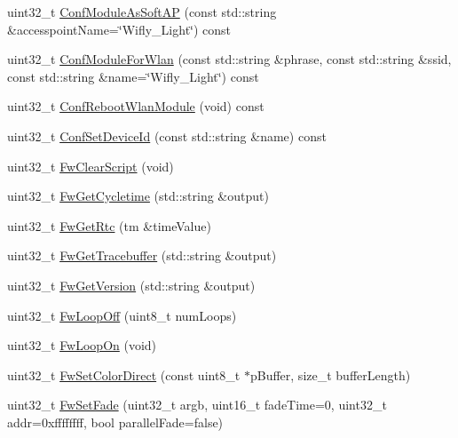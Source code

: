 \begin{DoxyCompactItemize}
\item 
uint32\-\_\-t \hyperlink{class_wifly_control_no_throw_a3e64aeb861c86a81d9818321b2876ffd}{Conf\-Module\-As\-Soft\-A\-P} (const std\-::string \&accesspoint\-Name=\char`\"{}Wifly\-\_\-\-Light\char`\"{}) const 
\item 
uint32\-\_\-t \hyperlink{class_wifly_control_no_throw_a0908df657166fd35beb0175a7417538e}{Conf\-Module\-For\-Wlan} (const std\-::string \&phrase, const std\-::string \&ssid, const std\-::string \&name=\char`\"{}Wifly\-\_\-\-Light\char`\"{}) const 
\item 
uint32\-\_\-t \hyperlink{class_wifly_control_no_throw_a611024109148250af6fa8d9e4c92aeca}{Conf\-Reboot\-Wlan\-Module} (void) const 
\item 
uint32\-\_\-t \hyperlink{class_wifly_control_no_throw_ab6e743c4f7f24600dbff799c303b243c}{Conf\-Set\-Device\-Id} (const std\-::string \&name) const 
\item 
uint32\-\_\-t \hyperlink{class_wifly_control_no_throw_a6554b5fd6b88408a23d802b49743dc4b}{Fw\-Clear\-Script} (void)
\item 
uint32\-\_\-t \hyperlink{class_wifly_control_no_throw_adc034f541e4b7f8cd18a1419c5fcaaba}{Fw\-Get\-Cycletime} (std\-::string \&output)
\item 
uint32\-\_\-t \hyperlink{class_wifly_control_no_throw_a0b9c93faf22030856003b9e3b02d16d1}{Fw\-Get\-Rtc} (tm \&time\-Value)
\item 
uint32\-\_\-t \hyperlink{class_wifly_control_no_throw_ae7c1d98947c9a5c8742504c49981a355}{Fw\-Get\-Tracebuffer} (std\-::string \&output)
\item 
uint32\-\_\-t \hyperlink{class_wifly_control_no_throw_ad5241b18ede5b489b52570f5b5938192}{Fw\-Get\-Version} (std\-::string \&output)
\item 
uint32\-\_\-t \hyperlink{class_wifly_control_no_throw_a81a2b5f0499c9aae84f7a8150a54df1d}{Fw\-Loop\-Off} (uint8\-\_\-t num\-Loops)
\item 
uint32\-\_\-t \hyperlink{class_wifly_control_no_throw_a13df2bbf2a0e8cfc31d80137a61e06eb}{Fw\-Loop\-On} (void)
\item 
uint32\-\_\-t \hyperlink{class_wifly_control_no_throw_a90186029abfde0d299c6fe232747452d}{Fw\-Set\-Color\-Direct} (const uint8\-\_\-t $\ast$p\-Buffer, size\-\_\-t buffer\-Length)
\item 
uint32\-\_\-t \hyperlink{class_wifly_control_no_throw_ad54e9041e920a4ed43b7b6fbd597c9c7}{Fw\-Set\-Fade} (uint32\-\_\-t argb, uint16\-\_\-t fade\-Time=0, uint32\-\_\-t addr=0xffffffff, bool parallel\-Fade=false)

\end{DoxyCompactItemize}
